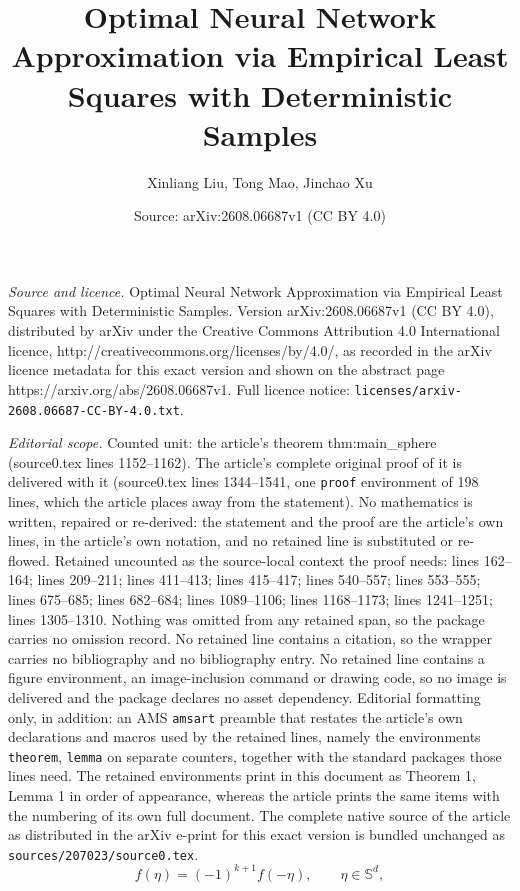 \documentclass[10pt,a4paper]{amsart}
\title{Optimal Neural Network Approximation via Empirical Least Squares with Deterministic Samples}
\author{Xinliang Liu, Tong Mao, Jinchao Xu}
\date{Source: arXiv:2608.06687v1 (CC BY 4.0)}
\def\SS{\mathbb{S}}
\begin{document}
\maketitle

\noindent\emph{Source and licence.} Optimal Neural Network Approximation via Empirical Least Squares with Deterministic Samples. Version arXiv:2608.06687v1 (CC BY 4.0), distributed by arXiv under the Creative Commons Attribution 4.0 International licence, http://creativecommons.org/licenses/by/4.0/, as recorded in the arXiv licence metadata for this exact version and shown on the abstract page https://arxiv.org/abs/2608.06687v1. Full licence notice: \texttt{licenses/arxiv-2608.06687-CC-BY-4.0.txt}.\par\smallskip

\noindent\textit{Editorial scope.} Counted unit: the article's theorem thm:main\_sphere (source0.tex lines 1152--1162). The article's complete original proof of it is delivered with it (source0.tex lines 1344--1541, one \texttt{proof} environment of 198 lines, which the article places away from the statement). No mathematics is written, repaired or re-derived: the statement and the proof are the article's own lines, in the article's own notation, and no retained line is substituted or re-flowed.  Retained uncounted as the source-local context the proof needs: lines 162--164; lines 209--211; lines 411--413; lines 415--417; lines 540--557; lines 553--555; lines 675--685; lines 682--684; lines 1089--1106; lines 1168--1173; lines 1241--1251; lines 1305--1310.  Nothing was omitted from any retained span, so the package carries no omission record.  No retained line contains a citation, so the wrapper carries no bibliography and no bibliography entry.  No retained line contains a figure environment, an image-inclusion command or drawing code, so no image is delivered and the package declares no asset dependency.  Editorial formatting only, in addition: an AMS \texttt{amsart} preamble that restates the article's own declarations and macros used by the retained lines, namely the environments \texttt{theorem}, \texttt{lemma} on separate counters, together with the standard packages those lines need.  The retained environments print in this document as Theorem 1, Lemma 1 in order of appearance, whereas the article prints the same items with the numbering of its own full document.  The complete native source of the article as distributed in the arXiv e-print for this exact version is bundled unchanged as \texttt{sources/207023/source0.tex}.
\begin{equation}\label{eqn:f_evenodd_relu}
f(\eta)=(-1)^{k+1}f(-\eta),\qquad\eta\in\SS^d,
\end{equation}
\end{document}
